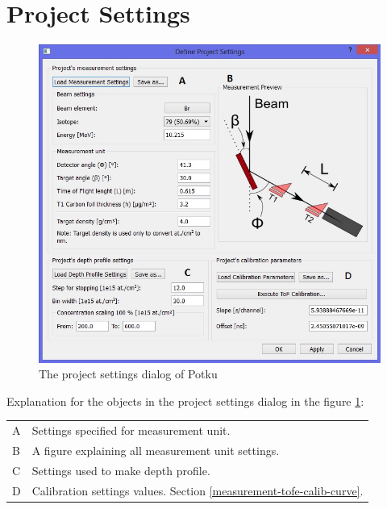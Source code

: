 \documentclass{scrreprt}
\begin{document}
\section{Project Settings}\label{projectsettings}
\begin{figure}[H]
\centering
\includegraphics[width=140mm]{projectsettings}
\caption{The project settings dialog of Potku}
\label{fig-projectsettings}
\end{figure}
Explanation for the objects in the project settings dialog in the figure \ref{fig-projectsettings}:

\begin{tabular}{ll}
A & Settings specified for measurement unit.\\
B & A figure explaining all measurement unit settings.\\
C & Settings used to make depth profile.\\
D & Calibration settings values. Section \ref{measurement-tofe-calib-curve}.\\
\end{tabular}

\end{document}
